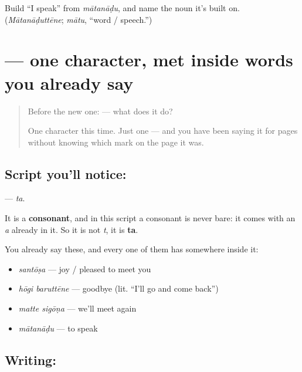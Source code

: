 \begin{tcolorbox}[breakable,colback=teal!4,colframe=teal!35!black,title={Before you move on}]
Build \textquotedblleft{}I speak\textquotedblright{} from \emph{mātanāḍu}, and name the noun it's built on. (\emph{Mātanāḍuttēne}; \emph{mātu}, \textquotedblleft{}word / speech.\textquotedblright{})
\end{tcolorbox}
\section[\texorpdfstring{\kn{ತ} (ta)}{ತ (ta)}]{ — one character, met inside words you already say}

\label{lesson:KA-S05-letter-ta}



\begin{quote}
Before the new one:  — what does it do?

One character this time. Just one — and you have been saying it for pages without knowing which mark on the page it was.
\end{quote}

\subsection*{Script you'll notice: }
\textbf{} — \emph{ta}.

It is a \textbf{consonant}, and in this script a consonant is never bare: it comes with an \emph{a} already in it. So it is not \emph{t}, it is \textbf{ta}.

You already say these, and every one of them has  somewhere inside it:

\begin{itemize}
\raggedright
  \item \textbf{} \emph{santōṣa} — joy / pleased to meet you
  \item \textbf{ } \emph{hōgi baruttēne} — goodbye (lit. \textquotedblleft{}I'll go and come back\textquotedblright{})
  \item \textbf{ } \emph{matte sigōṇa} — we'll meet again
  \item \textbf{} \emph{mātanāḍu} — to speak
\end{itemize}

\subsection*{Writing: }

